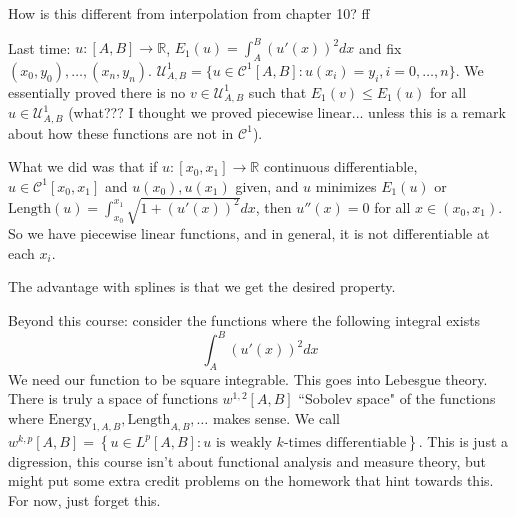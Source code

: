\documentclass{article}
\theoremstyle{plain}
\theoremstyle{remark}
\newcommand{\R}{{\mathbb R}}
\begin{document}
How is this different from interpolation from chapter 10?
ff

Last time: $u \colon [A,B] \to \R$, $E_1(u) = \int_A^B (u'(x))^2dx$ and
fix $(x_0,y_0),\dots,(x_n,y_n)$.
$\mathcal{U}^1_{A,B} = \{u \in \mathcal{C}^1[A,B] \colon u(x_i)=y_i, i=0,\dots,n\}$.
We essentially proved there is no $v \in \mathcal{U}_{A,B}^1$ such that
$E_1(v) \leq E_1(u)$ for all $u \in \mathcal{U}^1_{A,B}$
(what??? I thought we proved piecewise linear... unless this is a remark
about how these functions are not in $\mathcal{C}^1$).

What we did was that if $u \colon [x_0,x_1] \to \R$ continuous differentiable,
$u \in \mathcal{C}^1[x_0,x_1]$ and $u(x_0),u(x_1)$ given,
and $u$ minimizes $E_1(u)$ or $\text{Length}(u) = \int_{x_0}^{x_1} \sqrt{1+(u'(x))^2}dx$,
then $u''(x) = 0$ for all $x \in (x_0,x_1)$.
So we have piecewise linear functions, and in general, it is not
differentiable at each $x_i$.

The advantage with splines is that we get the desired property.

Beyond this course: consider the functions where the following integral exists
\[
	\int_A^B (u'(x))^2 dx
\]
We need our function to be square integrable.
This goes into Lebesgue theory.
There is truly a space of functions $w^{1,2}[A,B]$ ``Sobolev space"
of the functions where $\text{Energy}_{1,A,B}, \text{Length}_{A,B}, \dots$
makes sense.
We call $w^{k,p}[A,B] = \left\{u \in L^p[A,B] \colon u
\text{ is weakly }k\text{-times differentiable}\right\}$.
This is just a digression, this course isn't about functional analysis and measure theory,
but might put some extra credit problems on the homework that hint towards this.
For now, just forget this.
\end{document}
